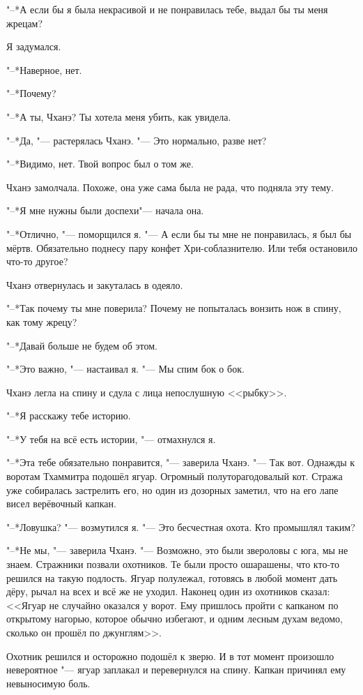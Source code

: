 \documentclass[a4paper,10pt,fleqn]{book}
\newcommand{\ldotst}{\so{...}\xspace}
\begin{document}
"--*А если бы я была некрасивой и не понравилась тебе, выдал бы ты меня жрецам?

Я задумался.

"--*Наверное, нет.

"--*Почему?

"--*А ты, Чханэ?
Ты хотела меня убить, как увидела.

"--*Да, "--- растерялась Чханэ.
"--- Это нормально, разве нет?

"--*Видимо, нет.
Твой вопрос был о том же.

Чханэ замолчала.
Похоже, она уже сама была не рада, что подняла эту тему.

"--*Я\ldotst мне нужны были доспехи\ldotst "--- начала она.

"--*Отлично, "--- поморщился я.
"--- А если бы ты мне не понравилась, я был бы мёртв.
Обязательно поднесу пару конфет Хри-соблазнителю.
Или тебя остановило что-то другое?

Чханэ отвернулась и закуталась в одеяло.

"--*Так почему ты мне поверила?
Почему не попыталась вонзить нож в спину, как тому жрецу?

"--*Давай больше не будем об этом.

"--*Это важно, "--- настаивал я.
"--- Мы спим бок о бок.

Чханэ легла на спину и сдула с лица непослушную <<рыбку>>.

"--*Я расскажу тебе историю.

"--*У тебя на всё есть истории, "--- отмахнулся я.

"--*Эта тебе обязательно понравится, "--- заверила Чханэ.
"--- Так вот.
Однажды к воротам Тхаммитра подошёл ягуар.
Огромный полуторагодовалый кот.
Стража уже собиралась застрелить его, но один из дозорных заметил, что на его лапе висел верёвочный капкан.

"--*Ловушка? "--- возмутился я.
"--- Это бесчестная охота.
Кто промышлял таким?

"--*Не мы, "--- заверила Чханэ.
"--- Возможно, это были звероловы с юга, мы не знаем.
Стражники позвали охотников.
Те были просто ошарашены, что кто-то решился на такую подлость.
Ягуар полулежал, готовясь в любой момент дать дёру, рычал на всех и всё же не уходил.
Наконец один из охотников сказал: <<Ягуар не случайно оказался у ворот.
Ему пришлось пройти с капканом по открытому нагорью, которое обычно избегают, и одним лесным духам ведомо, сколько он прошёл по джунглям>>.

Охотник решился и осторожно подошёл к зверю.
И в тот момент произошло невероятное "--- ягуар заплакал и перевернулся на спину.
Капкан причинял ему невыносимую боль.
\end{document}
